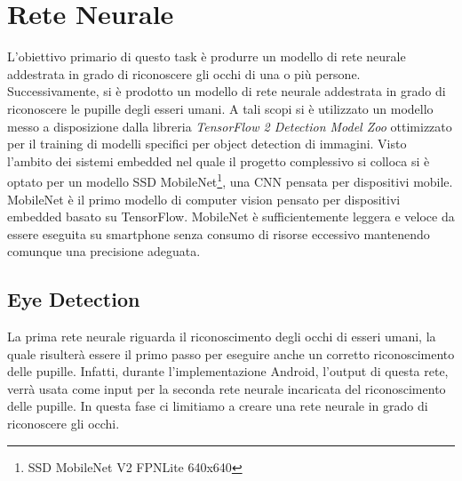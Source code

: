 \documentclass[11pt]{article}
\begin{document}
\newpage

\section{Rete Neurale}
L’obiettivo primario di questo task è produrre un modello di rete neurale addestrata in grado di riconoscere gli occhi di una o più persone. Successivamente, si è prodotto un modello di rete neurale addestrata in grado di riconoscere le pupille degli esseri umani.
\newline
A tali scopi si è utilizzato un modello messo a disposizione dalla libreria \textit{TensorFlow 2 Detection Model Zoo} ottimizzato per il training di modelli specifici per object detection di immagini. Visto l’ambito dei sistemi embedded nel quale il progetto complessivo si colloca si è optato per un modello SSD MobileNet\footnote{SSD MobileNet V2 FPNLite 640x640}, una CNN pensata per dispositivi mobile. MobileNet è il primo modello di computer vision pensato per dispositivi embedded basato su TensorFlow. MobileNet è sufficientemente leggera e veloce da essere eseguita su smartphone senza consumo di risorse eccessivo mantenendo comunque una precisione adeguata.

\newpage

\subsection{Eye Detection}
La prima rete neurale riguarda il riconoscimento degli occhi di esseri umani, la quale risulterà essere il primo passo per eseguire anche un corretto riconoscimento delle pupille. Infatti, durante l'implementazione Android, l'output di questa rete, verrà usata come input per la seconda rete neurale incaricata del riconoscimento delle pupille. In questa fase ci limitiamo a creare una rete neurale in grado di riconoscere gli occhi.
\end{document}

